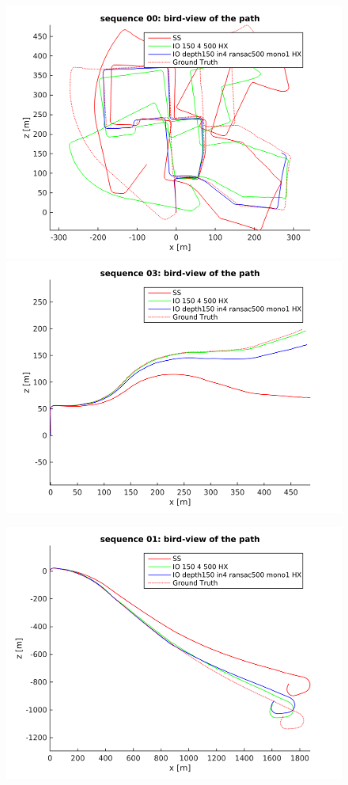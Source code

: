 \documentclass[runningheads]{llncs}
\begin{document}
\begin{figure}
  \begin{minipage}[t]{.3\linewidth}
    \centering
    \includegraphics[width=\textwidth]{top_path_00}
    \includegraphics[width=\textwidth]{top_path_03}
  \end{minipage}
  \begin{minipage}[t]{.3\linewidth}
    \centering
    \includegraphics[width=\textwidth]{top_path_01}

\end{minipage}
\end{figure}
\end{document}
